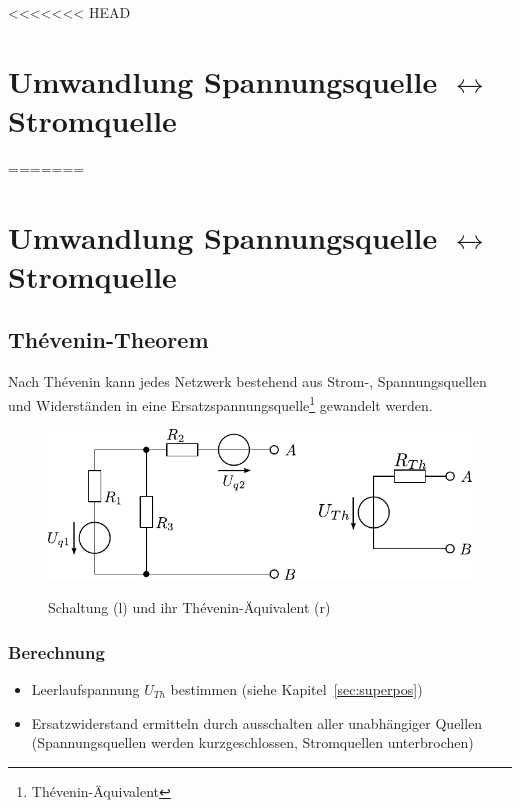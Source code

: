 



<<<<<<< HEAD
\section{Umwandlung Spannungsquelle $\leftrightarrow$ Stromquelle}
=======
\section{Umwandlung Spannungsquelle $\leftrightarrow$ Stromquelle}

\subsection{Thévenin-Theorem}
Nach Thévenin kann jedes Netzwerk bestehend aus Strom-, Spannungsquellen und Widerständen in eine Ersatzspannungsquelle\footnote{Thévenin-Äquivalent} gewandelt werden.

\begin{figure}[h!]
\centering
\includegraphics[scale=\schscale]{thevenin_sch_2.pdf}
\label{sch:thevenin}
\caption{Schaltung (l) und ihr Thévenin-Äquivalent (r)}
\end{figure}

\subsubsection{Berechnung}
\begin{itemize}
\item Leerlaufspannung $U_{Th}$ bestimmen (siehe Kapitel~\ref{sec:superpos})
\item Ersatzwiderstand ermitteln durch ausschalten aller unabhängiger Quellen (Spannungsquellen werden kurzgeschlossen, Stromquellen unterbrochen)
\end{itemize}

